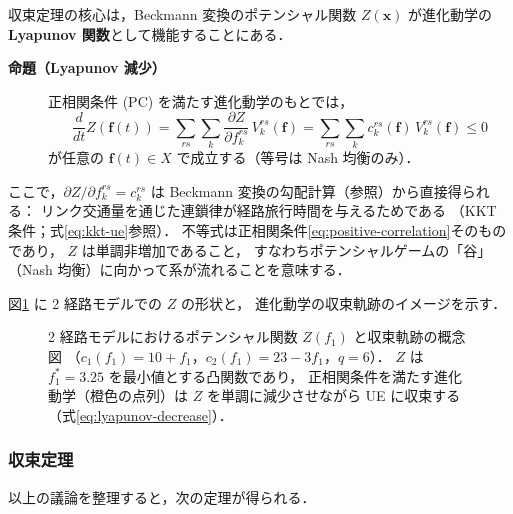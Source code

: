収束定理の核心は，Beckmann 変換のポテンシャル関数 $Z(\boldsymbol{x})$
が進化動学の\textbf{Lyapunov 関数}として機能することにある．

\begin{description}
  \item[\textbf{命題（Lyapunov 減少）}]
    正相関条件 (PC) を満たす進化動学のもとでは，
    \begin{equation}
      \frac{d}{dt} Z(\boldsymbol{f}(t))
      = \sum_{rs} \sum_{k} \frac{\partial Z}{\partial f_k^{rs}}\, V_k^{rs}(\boldsymbol{f})
      = \sum_{rs} \sum_{k} c_k^{rs}(\boldsymbol{f})\, V_k^{rs}(\boldsymbol{f})
      \leq 0
      \label{eq:lyapunov-decrease}
    \end{equation}
    が任意の $\boldsymbol{f}(t) \in X$ で成立する（等号は Nash 均衡のみ）．
\end{description}

ここで，$\partial Z / \partial f_k^{rs} = c_k^{rs}$ は
Beckmann 変換の勾配計算（参照）から直接得られる：
リンク交通量を通じた連鎖律が経路旅行時間を与えるためである
（KKT 条件；式\eqref{eq:kkt-ue}参照）．
不等式は正相関条件\eqref{eq:positive-correlation}そのものであり，
$Z$ は単調非増加であること，
すなわちポテンシャルゲームの「谷」（Nash 均衡）に向かって系が流れることを意味する．

図\ref{fig:potential-z} に 2 経路モデルでの $Z$ の形状と，
進化動学の収束軌跡のイメージを示す．

\begin{figure}[hbtp]
  \centering
  
  \caption{2 経路モデルにおけるポテンシャル関数 $Z(f_1)$ と収束軌跡の概念図
           （$c_1(f_1)=10+f_1$，$c_2(f_1)=23-3f_1$，$q=6$）．
           $Z$ は $f_1^* = 3.25$ を最小値とする凸関数であり，
           正相関条件を満たす進化動学（橙色の点列）は
           $Z$ を単調に減少させながら UE に収束する（式\eqref{eq:lyapunov-decrease}）．}
  \label{fig:potential-z}
\end{figure}

\subsubsection*{収束定理}

以上の議論を整理すると，次の定理が得られる．

